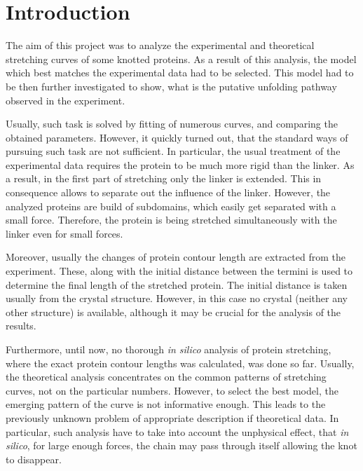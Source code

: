 \chapter{Introduction}
\label{ch:intro}

The aim of this project was to analyze the experimental and theoretical stretching curves of some knotted proteins.
As a result of this analysis, the model which best matches the experimental data had to be selected.
This model had to be then further investigated to show, what is the putative unfolding pathway observed in the experiment.

Usually, such task is solved by fitting of numerous curves, and comparing the obtained parameters.
However, it quickly turned out, that the standard ways of pursuing such task are not sufficient.
In particular, the usual treatment of the experimental data requires the protein to be much more rigid than the linker.
As a result, in the first part of stretching only the linker is extended.
This in consequence allows to separate out the influence of the linker.
However, the analyzed proteins are build of subdomains, which easily get separated with a small force.
Therefore, the protein is being stretched simultaneously with the linker even for small forces.

Moreover, usually the changes of protein contour length are extracted from the experiment.
These, along with the initial distance between the termini is used to determine the final length of the stretched protein.
The initial distance is taken usually from the crystal structure.
However, in this case no crystal (neither any other structure) is available, although it may be crucial for the analysis of the results.

Furthermore, until now, no thorough \textit{in silico} analysis of protein stretching, where the exact protein contour lengths was calculated, was done so far.
Usually, the theoretical analysis concentrates on the common patterns of stretching curves, not on the particular numbers.
However, to select the best model, the emerging pattern of the curve is not informative enough.
This leads to the previously unknown problem of appropriate description if theoretical data.
In particular, such analysis have to take into account the unphysical effect, that \textit{in silico}, for large enough forces, the chain may pass through itself allowing the knot to disappear.

